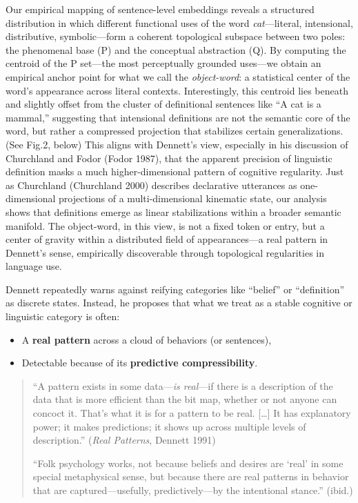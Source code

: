\documentclass[12pt]{article}
\providecommand{\tightlist}{}   %
\begin{document}
Our empirical mapping of sentence-level embeddings reveals a structured distribution in which different functional uses of the word \emph{cat}---literal, intensional, distributive, symbolic---form a coherent topological subspace between two poles: the phenomenal base (P) and the conceptual abstraction (Q). By computing the centroid of the P set---the most perceptually grounded uses---we obtain an empirical anchor point for what we call the \emph{object-word}: a statistical center of the word's appearance across literal contexts. Interestingly, this centroid lies beneath and slightly offset from the cluster of definitional sentences like ``A cat is a mammal,'' suggesting that intensional definitions are not the semantic core of the word, but rather a compressed projection that stabilizes certain generalizations. (See Fig.2, below) This aligns with Dennett's view, especially in his discussion of Churchland and Fodor (Fodor 1987), that the apparent precision of linguistic definition masks a much higher-dimensional pattern of cognitive regularity. Just as Churchland (Churchland 2000) describes declarative utterances as one-dimensional projections of a multi-dimensional kinematic state, our analysis shows that definitions emerge as linear stabilizations within a broader semantic manifold. The object-word, in this view, is not a fixed token or entry, but a center of gravity within a distributed field of appearances---a real pattern in Dennett's sense, empirically discoverable through topological regularities in language use.

Dennett repeatedly warns against reifying categories like ``belief'' or ``definition'' as discrete states. Instead, he proposes that what we treat as a stable cognitive or linguistic category is often:

\begin{itemize}
\tightlist
\item
  A \textbf{real pattern} across a cloud of behaviors (or sentences),
\item
  Detectable because of its \textbf{predictive compressibility}.
\end{itemize}

\begin{quote}
``A pattern exists in some data---\emph{is real}---if there is a description of the data that is more efficient than the bit map, whether or not anyone can concoct it. That's what it is for a pattern to be real. {[}\ldots{]} It has explanatory power; it makes predictions; it shows up across multiple levels of description.'' (\emph{Real Patterns}, Dennett 1991)

``Folk psychology works, not because beliefs and desires are `real' in some special metaphysical sense, but because there are real patterns in behavior that are captured---usefully, predictively---by the intentional stance.'' (ibid.)
\end{quote}
\end{document}
